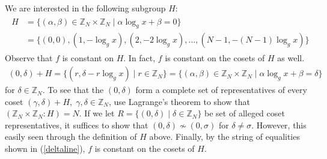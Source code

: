 We are interested in the following subgroup $H$:
\begin{gather*}
  \begin{split}
    H & = \{ (\alpha,\beta) \in \mathbb{Z}_N \times \mathbb{Z}_N \mid \alpha\log_g{x} + \beta = 0\} \\
      & = \{(0,0), (1, -\log_g{x}), (2, -2 \log_g{x}), \dots ,(N-1, -(N-1)\log_g{x}) \}
  \end{split}
\end{gather*}
Observe that $f$ is constant on $H$. In fact, $f$ is constant on the cosets of $H$ as well.
%
\begin{gather}
  \label{deltaline}
(0, \delta) + H = \{(r, \delta - r \log_g{x}) \mid r \in \mathbb{Z}_N\} = \{ (\alpha,\beta) \in \mathbb{Z}_N \times \mathbb{Z}_N \mid \alpha\log_g{x} + \beta = \delta\}
\end{gather}
for $\delta \in \mathbb{Z}_N$. To see that the $(0,\delta)$ form a complete set of representatives of every coset $(\gamma, \delta) + H, \; \gamma,\delta \in \mathbb{Z}_N$, use Lagrange's theorem to show that $(\mathbb{Z}_N \times \mathbb{Z}_N : H) = N$. If we let $R =\{(0,\delta) \mid \delta \in \mathbb{Z}_N\}$ be set of alleged coset representatives, it suffices to show that $(0,\delta) \not\sim (0,\sigma)$ for $\delta \neq \sigma$. However, this easily seen through the definition of $H$ above. Finally, by the string of equalities shown in (\ref{deltaline}), $f$ is constant on the cosets of $H$.
%

